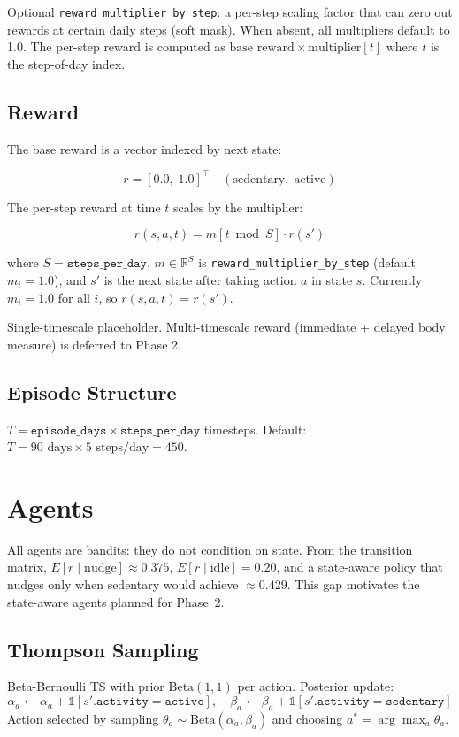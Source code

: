 \documentclass[11pt]{article}
\begin{document}
Optional \texttt{reward\_multiplier\_by\_step}: a per-step scaling factor that can zero out rewards at certain daily steps (soft mask). When absent, all multipliers default to 1.0. The per-step reward is computed as $\text{base reward} \times \text{multiplier}[t]$ where $t$ is the step-of-day index.

\subsection{Reward}\label{sec:reward}

The base reward is a vector indexed by next state:

\[
r = [0.0,\; 1.0]^\top \quad (\text{sedentary},\; \text{active})
\]

The per-step reward at time $t$ scales by the multiplier:

\[
r(s, a, t) = m[t \bmod S] \cdot r(s')
\]

where $S = \texttt{steps\_per\_day}$, $m \in \mathbb{R}^S$ is \texttt{reward\_multiplier\_by\_step}
(default $m_i = 1.0$), and $s'$ is the next state after taking action $a$ in state $s$.
Currently $m_i = 1.0$ for all $i$, so $r(s, a, t) = r(s')$.

Single-timescale placeholder. Multi-timescale reward (immediate + delayed body measure) is deferred to Phase 2.

\subsection{Episode Structure}
$T = \texttt{episode\_days} \times \texttt{steps\_per\_day}$ timesteps. Default: $T = 90 \text{ days} \times 5 \text{ steps/day} = 450$.

\section{Agents}

All agents are bandits: they do not condition on state. From the transition matrix,
$E[r \mid \text{nudge}] \approx 0.375$, $E[r \mid \text{idle}] = 0.20$, and a
state-aware policy that nudges only when sedentary would achieve $\approx 0.429$.
This gap motivates the state-aware agents planned for Phase~2.

\subsection{Thompson Sampling}
Beta-Bernoulli TS with prior $\text{Beta}(1, 1)$ per action. Posterior update:
\[
\alpha_a \leftarrow \alpha_a + \mathbb{1}[s'.\texttt{activity} = \texttt{active}], \quad
\beta_a \leftarrow \beta_a + \mathbb{1}[s'.\texttt{activity} = \texttt{sedentary}]
\]
Action selected by sampling $\theta_a \sim \text{Beta}(\alpha_a, \beta_a)$ and choosing $a^* = \arg\max_a \theta_a$.
\end{document}
